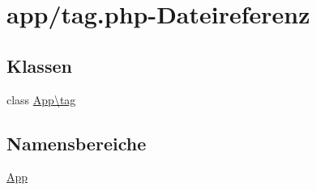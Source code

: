 \hypertarget{tag_8php}{}\section{app/tag.php-\/\+Dateireferenz}
\label{tag_8php}
\subsection*{Klassen}
\begin{DoxyCompactItemize}
\item 
class \hyperlink{classApp_1_1tag}{App\textbackslash{}tag}
\end{DoxyCompactItemize}
\subsection*{Namensbereiche}
\begin{DoxyCompactItemize}
\item 
 \hyperlink{namespaceApp}{App}
\end{DoxyCompactItemize}
